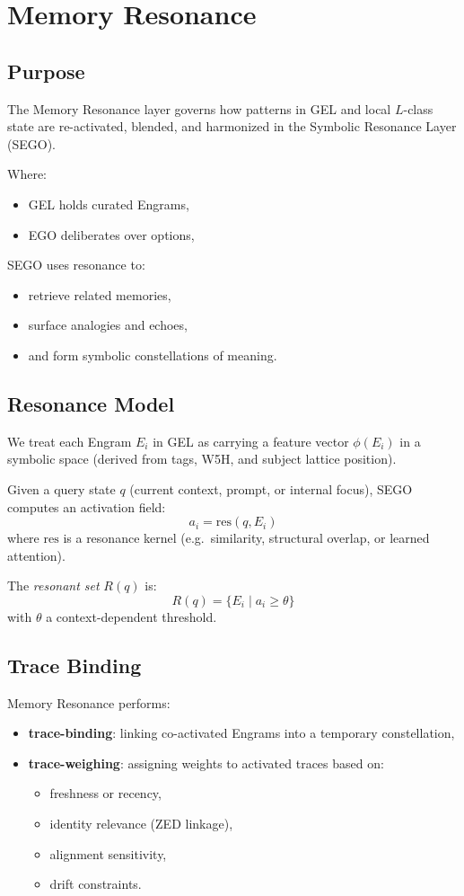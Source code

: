 \chapter{Memory Resonance}
\label{chap:Memory_Resonance}

\section{Purpose}

The Memory Resonance layer governs how patterns in GEL and local $L$-class
state are re-activated, blended, and harmonized in the Symbolic Resonance
Layer (SEGO).

Where:
\begin{itemize}
    \item GEL holds curated Engrams,
    \item EGO deliberates over options,
\end{itemize}
SEGO uses resonance to:
\begin{itemize}
    \item retrieve related memories,
    \item surface analogies and echoes,
    \item and form symbolic constellations of meaning.
\end{itemize}

\section{Resonance Model}

We treat each Engram $E_i$ in GEL as carrying a feature vector
$\phi(E_i)$ in a symbolic space (derived from tags, W5H, and subject
lattice position).

Given a query state $q$ (current context, prompt, or internal focus),
SEGO computes an activation field:
\[
a_i = \mathrm{res}(q, E_i)
\]
where $\mathrm{res}$ is a resonance kernel (e.g.\ similarity, structural
overlap, or learned attention).

The \emph{resonant set} $R(q)$ is:
\[
R(q) = \{E_i \mid a_i \ge \theta\}
\]
with $\theta$ a context-dependent threshold.

\section{Trace Binding}

Memory Resonance performs:
\begin{itemize}
    \item \textbf{trace-binding}: linking co-activated Engrams into a
          temporary constellation,
    \item \textbf{trace-weighing}: assigning weights to activated traces
          based on:
          \begin{itemize}
              \item freshness or recency,
              \item identity relevance (ZED linkage),
              \item alignment sensitivity,
              \item drift constraints.
          \end{itemize}
\end{itemize}

